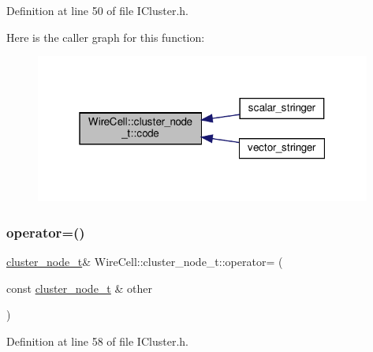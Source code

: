 Definition at line 50 of file I\+Cluster.\+h.

Here is the caller graph for this function\+:
\nopagebreak
\begin{figure}[H]
\begin{center}
\leavevmode
\includegraphics[width=313pt]{struct_wire_cell_1_1cluster__node__t_a787bef82478db4e57b94337016bd69fd_icgraph}
\end{center}
\end{figure}
\mbox{\label{struct_wire_cell_1_1cluster__node__t_a3f4e2b42526190ba5b21f02be9b030e4}} 
\subsubsection{\texorpdfstring{operator=()}{operator=()}}
{\footnotesize\ttfamily \hyperlink{struct_wire_cell_1_1cluster__node__t}{cluster\+\_\+node\+\_\+t}\& Wire\+Cell\+::cluster\+\_\+node\+\_\+t\+::operator= (\begin{DoxyParamCaption}\item[{const \hyperlink{struct_wire_cell_1_1cluster__node__t}{cluster\+\_\+node\+\_\+t} \&}]{other }\end{DoxyParamCaption})\hspace{0.3cm}{\ttfamily [inline]}}



Definition at line 58 of file I\+Cluster.\+h.

\mbox{\label{struct_wire_cell_1_1cluster__node__t_aa9badf743caf46bd785c858817eb65d0}} 
